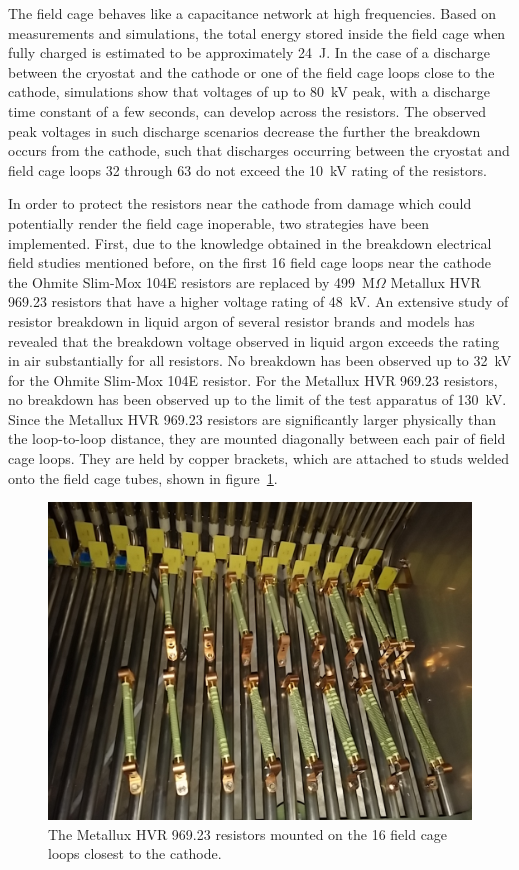 The field cage behaves like a capacitance network at high frequencies. Based on measurements and simulations, the total energy stored inside the field cage when fully charged is estimated to be approximately 24~J. In the case of a discharge between the cryostat and the cathode or one of the field cage loops close to the cathode, simulations show that voltages of up to 80~kV peak, with a discharge time constant of a few seconds, can develop across the resistors. The observed peak voltages in such discharge scenarios decrease the further the breakdown occurs from the cathode, such that discharges occurring between the cryostat and field cage loops 32 through 63 do not exceed the 10~kV rating of the resistors.

In order to protect the resistors near the cathode from damage which could potentially render the field cage inoperable, two strategies have been implemented.  First, due to the knowledge obtained in the breakdown electrical field studies mentioned before, on the first 16 field cage loops near the cathode the Ohmite Slim-Mox 104E resistors are replaced by 499~M$\Omega$ Metallux HVR 969.23 resistors that have a higher voltage rating of 48~kV. An extensive study of resistor breakdown in liquid argon of several resistor brands and models \cite{Bagby:2014wva} has revealed that the breakdown voltage observed in liquid argon exceeds the rating in air substantially for all resistors. No breakdown has been observed up to 32~kV for the Ohmite Slim-Mox 104E resistor. For the Metallux HVR 969.23 resistors, no breakdown has been observed up to the limit of the test apparatus of 130~kV.  Since the Metallux HVR 969.23 resistors are significantly larger physically than the loop-to-loop distance, they are mounted diagonally between each pair of field cage loops. They are held by copper brackets, which are attached to studs welded onto the field cage tubes, shown in figure~\ref{fig:tpc-voltage-divider-metallux}.

\begin{figure}[htb]
\centering	
\includegraphics[width=0.8\linewidth]{figures/tpc-voltage-divider-metallux.jpg}
\caption{The Metallux HVR 969.23 resistors mounted on the 16 field cage loops closest to the cathode.}
\label{fig:tpc-voltage-divider-metallux}
\end{figure}


